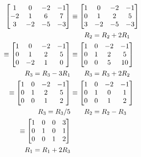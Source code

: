 \documentclass{../mathhomework}
\newenvironment{Mat}{\begin{bmatrix}}{\end{bmatrix}}
\begin{document}
\begin{problem}[1.8\#3]
    \begin{solution}
        \begin{align*}
            \begin{Mat}
                1 & 0 & -2 & -1\\
                -2 & 1 & 6 & 7\\
                3 & -2 & -5 & -3
            \end{Mat} 
            & \equiv \begin{Mat}
                1 & 0 & -2 & -1\\
                0 & 1 & 2 & 5\\
                3 & -2 & -5 & -3
            \end{Mat}
            \\ 
            & \qquad{} R_2 = R_2 + 2R_1 \\
            \equiv \begin{Mat}
                1 & 0 & -2 & -1\\
                0 & 1 & 2 & 5\\
                0 & -2 & 1 & 0
            \end{Mat}
            & \equiv \begin{Mat}
                1 & 0 & -2 & -1\\
                0 & 1 & 2 & 5\\
                0 & 0 & 5 & 10
            \end{Mat}
            \\ 
            R_3 = R_3 - 3R_1 & \qquad{} R_3 = R_3 + 2R_2 \\
            \equiv \begin{Mat}
                1 & 0 & -2 & -1\\
                0 & 1 & 2 & 5\\
                0 & 0 & 1 & 2
            \end{Mat}
            & \equiv \begin{Mat}
                1 & 0 & -2 & -1\\
                0 & 1 & 0 & 1\\
                0 & 0 & 1 & 2
            \end{Mat}
            \\ 
            R_3 = R_3/5 & \qquad{} R_2 = R_2 - R_3 \\
            \equiv \begin{Mat}
                1 & 0 & 0 & 3\\
                0 & 1 & 0 & 1\\
                0 & 0 & 1 & 2
            \end{Mat} 
            \\
            R_1 = R_1 + 2R_3
        \end{align*}


\end{solution}
\end{problem}
\end{document}
